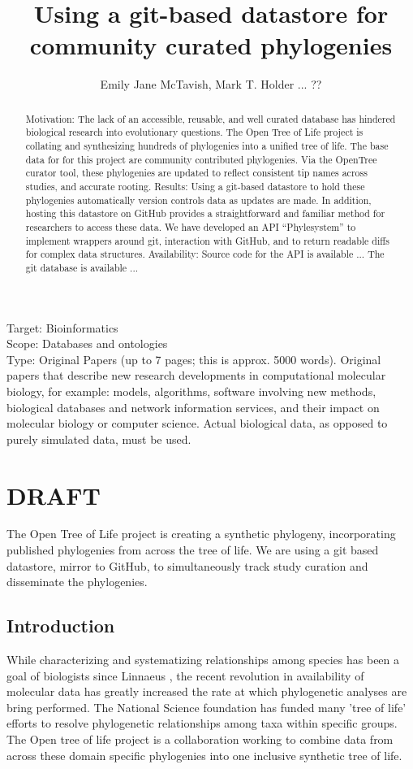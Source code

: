 \documentclass[a4paper,10pt]{article}
\title{Using a git-based datastore for community curated phylogenies}
\author{Emily Jane McTavish, Mark T. Holder ... ??}
\begin{document}
\maketitle

Target: Bioinformatics\\
Scope: Databases and ontologies\\
Type: Original Papers (up to 7 pages; this is approx. 5000 words).
Original papers that describe new research developments in computational molecular biology, for example: 
models, algorithms, software involving new methods, biological databases and network information services, and their impact on molecular biology or computer science. 
Actual biological data, as opposed to purely simulated data, must be used.


\begin{abstract}
Motivation:
The lack of an accessible, reusable, and well curated database has hindered biological research into evolutionary questions.
The Open Tree of Life project is collating and synthesizing hundreds of phylogenies into a unified tree of life. 
The base data for for this project are community contributed phylogenies. 
Via the OpenTree curator tool, these phylogenies are updated to reflect consistent tip names across studies, and accurate rooting. 
Results:
Using a git-based datastore to hold these phylogenies automatically version controls data as updates are made. 
In addition, hosting this datastore on GitHub provides a straightforward and familiar method for researchers to access these data. 
We have developed an API ``Phylesystem'' to implement wrappers around git, interaction with GitHub, and to return readable diffs for complex data structures.
Availability:
Source code for the API is available ...
The git database is available ...
\end{abstract}

\section{DRAFT}
The Open Tree of Life project is creating a synthetic phylogeny, incorporating published phylogenies from across the tree of life.
We are using a git based datastore, mirror to GitHub, to simultaneously track study curation and disseminate the phylogenies.


\subsection{Introduction}
 While characterizing and systematizing relationships among species has been a goal of biologists since Linnaeus \cite{Linneaus}, 
 the recent revolution in availability of molecular data has greatly increased the rate at which phylogenetic analyses are bring performed.
 The National Science foundation has funded many 'tree of life' efforts to resolve phylogenetic relationships among taxa within specific groups.
 The Open tree of life project is a collaboration working to combine data from across these domain specific phylogenies into one inclusive synthetic tree of life.
 
\end{document}
